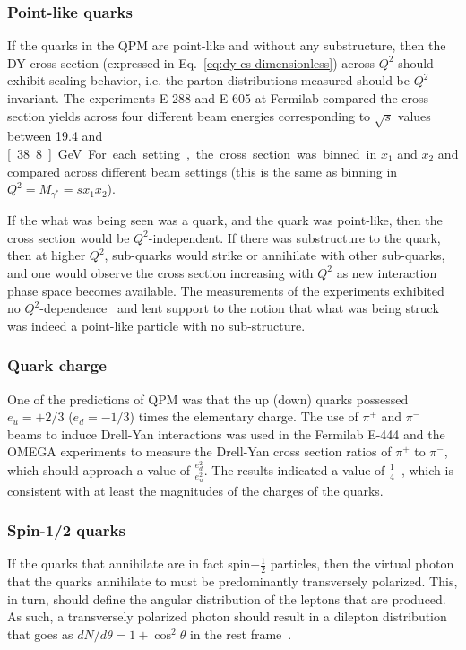 \subsubsection{Point-like quarks}

If the quarks in the QPM are point-like and without any substructure, then the DY cross section (expressed in Eq.~\ref{eq:dy-cs-dimensionless}) across $Q^2$ should exhibit scaling behavior, i.e. the parton distributions measured should be $Q^2$-invariant. The experiments E-288 and E-605 at Fermilab compared the cross section yields across four different beam energies corresponding to $\sqrt{s}$ values between 19.4 and \unit[38.8]{GeV}. For each setting, the cross section was binned in $x_1$ and $x_2$ and compared across different beam settings (this is the same as binning in $Q^2=M_{\gamma^*}=sx_1x_2$).

If the what was being seen was a quark, and the quark was point-like, then the cross section would be $Q^2$-independent. If there was substructure to the quark, then at higher $Q^2$, sub-quarks would strike or annihilate with other sub-quarks, and one would observe the cross section increasing with $Q^2$ as new interaction phase space becomes available. The measurements of the experiments exhibited no $Q^2$-dependence~\cite{PhysRevD.23.604, Brown:1989fj} and lent support to the notion that what was being struck was indeed a point-like particle with no sub-structure.

\subsubsection{Quark charge}

One of the predictions of QPM was that the up (down) quarks possessed $e_u=+2/3$ ($e_d=-1/3$) times the elementary charge. The use of $\pi^+$ and $\pi^-$ beams to induce Drell-Yan interactions was used in the Fermilab E-444 and the OMEGA experiments to measure the Drell-Yan cross section ratios of $\pi^+$ to $\pi^-$, which should approach a value of $\frac{e^2_d}{e^2_u}$. The results indicated a value of $\frac{1}{4}$~\cite{GrossoPilcher:1986nk, Hogan:1979tu}, which is consistent with at least the magnitudes of the charges of the quarks.

\subsubsection{Spin-1/2 quarks}

If the quarks that annihilate are in fact spin$-\frac{1}{2}$ particles, then the virtual photon that the quarks annihilate to must be predominantly transversely polarized. This, in turn, should define the angular distribution of the leptons that are produced. As such, a transversely polarized photon should result in a dilepton distribution that goes as $dN/d\theta = 1+\cos^2\theta$ in the rest frame~\cite{Kenyon:1982tg}.

